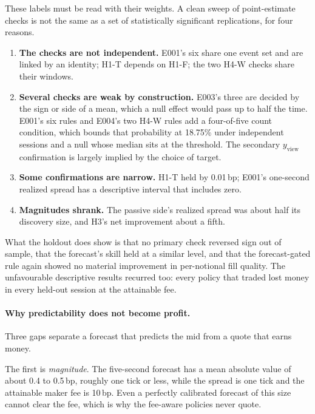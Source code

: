 \documentclass[11pt]{article}
\makeatletter
\newcommand{\bp}{\,bp}
\renewcommand\section{\@startsection{section}{1}{\z@}{-3.25ex\@plus -1ex \@minus -.2ex}{1.5ex \@plus .2ex}{\normalfont\large\bfseries}}
\makeatother
\begin{document}
These labels must be read with their weights. A clean sweep of point-estimate checks is not the same as a set of
statistically significant replications, for four reasons.
\begin{enumerate}
  \item \textbf{The checks are not independent.} E001's six share one event set and are linked by an identity; H1-T
  depends on H1-F; the two H4-W checks share their windows.
  \item \textbf{Several checks are weak by construction.} E003's three are decided by the sign or side of a mean, which
  a null effect would pass up to half the time. E001's six rules and E004's two H4-W rules add a four-of-five count
  condition, which bounds that probability at 18.75\% under independent sessions and a null whose median sits at the
  threshold. The secondary $y_\mathrm{view}$ confirmation is largely implied by the choice of target.
  \item \textbf{Some confirmations are narrow.} H1-T held by 0.01\bp; E001's one-second realized spread has a descriptive
  interval that includes zero.
  \item \textbf{Magnitudes shrank.} The passive side's realized spread was about half its discovery size, and H3's net
  improvement about a fifth.
\end{enumerate}
What the holdout does show is that no primary check reversed sign out of sample, that the forecast's skill held at a
similar level, and that the forecast-gated rule again showed no material improvement in per-notional fill quality. The unfavourable descriptive results recurred too:
every policy that traded lost money in every held-out session at the attainable fee.

\section{Discussion}\label{sec:discussion}

\paragraph{Why predictability does not become profit.} Three gaps separate a forecast that predicts the mid from a
quote that earns money.

The first is \emph{magnitude}. The five-second forecast has a mean absolute value of about 0.4 to 0.5\bp, roughly one
tick or less, while the spread is one tick and the attainable maker fee is 10\bp. Even a perfectly calibrated forecast of
this size cannot clear the fee, which is why the fee-aware policies never quote.
\end{document}
